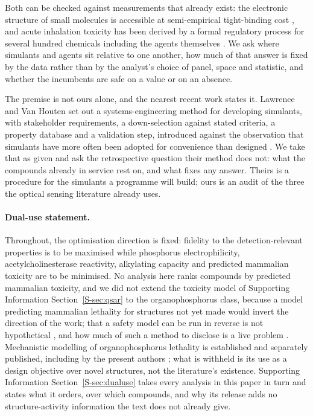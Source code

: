 \documentclass[journal=ancham,manuscript=article,margin=1in]{achemso}
\begin{document}
Both can be checked against measurements that already exist: the electronic
structure of small molecules is accessible at semi-empirical tight-binding cost
\cite{gfnxtb2017,bannwarth2019}, and acute inhalation toxicity has been derived
by a formal regulatory process for several hundred chemicals including the
agents themselves \cite{watson2006}. We ask where simulants and agents sit
relative to one another, how much of that answer is fixed by the data rather
than by the analyst's choice of panel, space and statistic, and whether the
incumbents are safe on a value or on an absence.

The premise is not ours alone, and the nearest recent work states it. Lawrence
and Van Houten set out a systems-engineering method for developing simulants,
with stakeholder requirements, a down-selection against stated criteria, a
property database and a validation step, introduced against the observation that
simulants have more often been adopted for convenience than designed
\cite{lawrence2025simulants}. We take that as given and ask the retrospective
question their method does not: what the compounds already in service rest on,
and what fixes any answer. Theirs
is a procedure for the simulants a programme will build; ours is an audit of the
three the optical sensing literature already uses.

\paragraph{Dual-use statement.} Throughout, the optimisation direction is
fixed: fidelity to the detection-relevant properties is to be maximised while
phosphorus electrophilicity, acetylcholinesterase reactivity, alkylating
capacity and predicted mammalian toxicity are to be minimised. No analysis here
ranks compounds by predicted mammalian toxicity, and we did not extend the
toxicity model of Supporting Information Section~\ref{S-sec:qsar} to the
organophosphorus class, because a model predicting mammalian lethality for
structures not yet made would invert the direction of the work; that a safety
model can be run in reverse is not hypothetical \cite{urbina2022}, and how much
of such a method to disclose is a live problem \cite{cbrndisclose}. Mechanistic
modelling of organophosphorus lethality is established and separately published,
including by the present authors \cite{qsarld50}; what is withheld is its use as
a design objective over novel structures, not the literature's existence.
Supporting Information Section~\ref{S-sec:dualuse} takes every analysis in this
paper in turn and states what it orders, over which compounds, and why its
release adds no structure-activity information the text does not already give.
\end{document}
